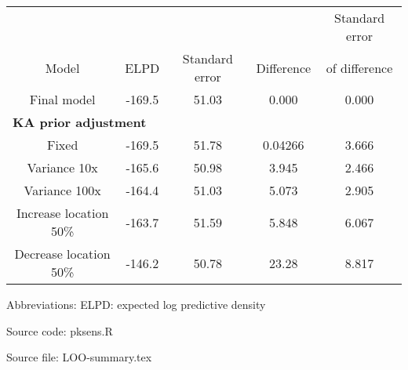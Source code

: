 \setlength{\tabcolsep}{5pt} 
\begin{threeparttable}
\renewcommand{\arraystretch}{1.3}
\begin{tabular}[h]{ccccc}
\hline
 &  &  &  & Standard error \\ [-0.52em]
Model & ELPD & Standard error & Difference & of difference \\
\hline
Final model & -169.5 & 51.03 & 0.000 & 0.000 \\ \hline
\multicolumn{5}{l}{\textbf{KA prior adjustment}}\\%
Fixed & -169.5 & 51.78 & 0.04266 & 3.666 \\
Variance 10x & -165.6 & 50.98 & 3.945 & 2.466 \\
Variance 100x & -164.4 & 51.03 & 5.073 & 2.905 \\
Increase location 50\% & -163.7 & 51.59 & 5.848 & 6.067 \\
Decrease location 50\% & -146.2 & 50.78 & 23.28 & 8.817 \\
\hline
\end{tabular}
\begin{tablenotes}[flushleft]
\item Abbreviations: ELPD: expected log predictive density
\item Source code: pksens.R
\item Source file: LOO-summary.tex
\end{tablenotes}
\end{threeparttable}
